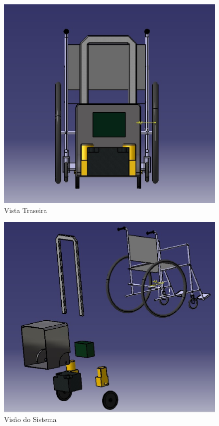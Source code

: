 \begin{figure}[!htb]
\centering
\includegraphics{figuras/estrutura/vista_traseira}
\caption{Vista Traseira}
\label{fig:traseira}
\end{figure}

\begin{figure}[!htb]
\centering
\includegraphics{figuras/estrutura/explode}
\caption{Visão do Sistema}
\label{fig:sistema}
\end{figure}

